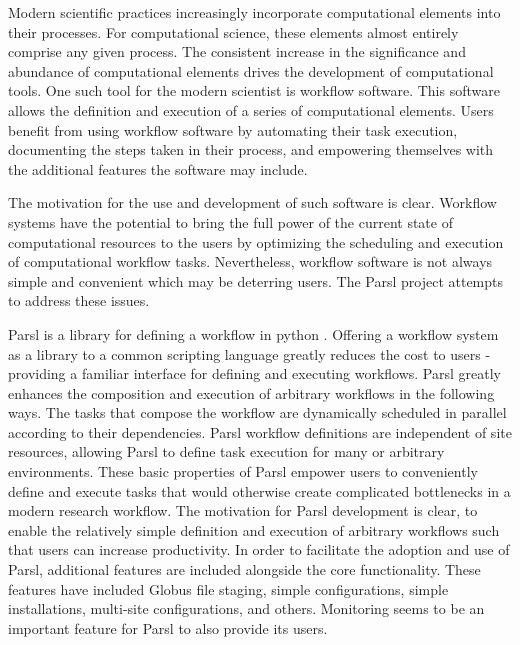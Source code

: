 Modern scientific practices increasingly incorporate computational elements into their processes.
For computational science, these elements almost entirely comprise any given process.
The consistent increase in the significance and abundance of computational elements drives the development of computational tools.
One such tool for the modern scientist is workflow software.
This software allows the definition and execution of a series of computational elements.
Users benefit from using workflow software by automating their task execution, documenting the steps taken in their process, and empowering themselves with the additional features the software may include.

The motivation for the use and development of such software is clear.
Workflow systems have the potential to bring the full power of the current state of computational resources to the users by optimizing the scheduling and execution of computational workflow tasks.
Nevertheless, workflow software is not always simple and convenient which may be deterring users.
The Parsl project attempts to address these issues.

Parsl is a library for defining a workflow in python \cite{babuji_yadu_2017_853492}.
Offering a workflow system as a library to a common scripting language greatly reduces the cost to users - providing a familiar interface for defining and executing workflows.
Parsl greatly enhances the composition and execution of arbitrary workflows in the following ways.
The tasks that compose the workflow are dynamically scheduled in parallel according to their dependencies.
Parsl workflow definitions are independent of site resources, allowing Parsl to define task execution for many or arbitrary environments.
These basic properties of Parsl empower users to conveniently define and execute tasks that would otherwise create complicated bottlenecks in a modern research workflow.
The motivation for Parsl development is clear, to enable the relatively simple definition and execution of arbitrary workflows such that users can increase productivity.
In order to facilitate the adoption and use of Parsl, additional features are included alongside the core functionality.
These features have included Globus file staging, simple configurations, simple installations, multi-site configurations, and others.
Monitoring seems to be an important feature for Parsl to also provide its users.

